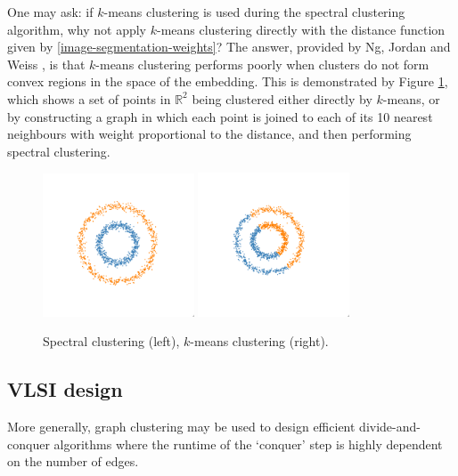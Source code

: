 \documentclass[a4paper,11pt]{article}
\theoremstyle{definition}
\newcommand{\R}{\mathbb{R}}
\begin{document}
\medskip

One may ask: if $k$-means clustering is used during the spectral clustering algorithm, why not apply $k$-means clustering directly with the distance function given by \eqref{image-segmentation-weights}? The answer, provided by Ng, Jordan and Weiss \cite{ngjordanweiss}, is that $k$-means clustering performs poorly when clusters do not form convex regions in the space of the embedding. This is demonstrated by Figure \ref{ngjordanweiss-image-spec}, which shows a set of points in $\R^2$ being clustered either directly by $k$-means, or by constructing a graph in which each point is joined to each of its 10 nearest neighbours with weight proportional to the distance, and then performing spectral clustering.

\begin{figure}
\centering
\includegraphics[width=0.4\textwidth]{scikit-spectral-clustering}
\includegraphics[width=0.4\textwidth]{scikit-kmeans}
\caption{Spectral clustering (left), $k$-means clustering (right).}\label{ngjordanweiss-image-spec}
\end{figure}

\subsection{VLSI design}

More generally, graph clustering may be used to design efficient divide-and-conquer algorithms where the runtime of the `conquer' step is highly dependent on the number of edges.
\end{document}

